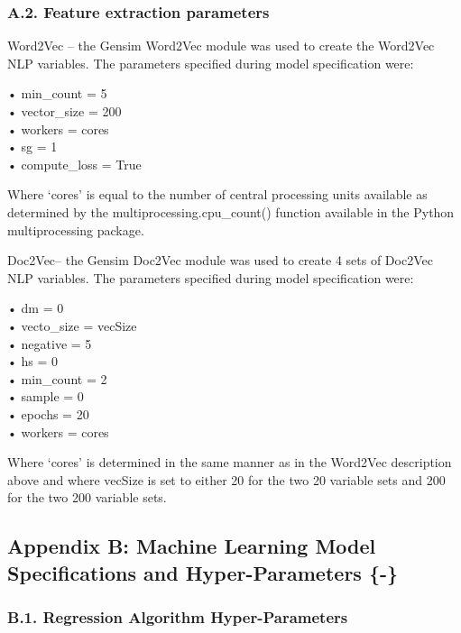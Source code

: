 \documentclass[11pt,preprint, authoryear]{elsarticle}
\numberwithin{equation}{section}
\numberwithin{figure}{section}
\numberwithin{table}{section}
\begin{document}
\hypertarget{a.2.-feature-extraction-parameters}{%
\subsubsection*{A.2. Feature extraction
parameters}\label{a.2.-feature-extraction-parameters}}

Word2Vec -- the Gensim Word2Vec module was used to create the Word2Vec
NLP variables. The parameters specified during model specification were:

• min\_count = 5\\
• vector\_size = 200\\
• workers = cores\\
• sg = 1\\
• compute\_loss = True

Where `cores' is equal to the number of central processing units
available as determined by the multiprocessing.cpu\_count() function
available in the Python multiprocessing package.

Doc2Vec-- the Gensim Doc2Vec module was used to create 4 sets of Doc2Vec
NLP variables. The parameters specified during model specification were:

• dm = 0\\
• vecto\_size = vecSize\\
• negative = 5\\
• hs = 0\\
• min\_count = 2\\
• sample = 0\\
• epochs = 20\\
• workers = cores

Where `cores' is determined in the same manner as in the Word2Vec
description above and where vecSize is set to either 20 for the two 20
variable sets and 200 for the two 200 variable sets.

\hypertarget{appendix-b-machine-learning-model-specifications-and-hyper-parameters--}{%
\subsection{\texorpdfstring{Appendix B: Machine Learning Model
Specifications and Hyper-Parameters \{-\}
\label{Appendix B}}{Appendix B: Machine Learning Model Specifications and Hyper-Parameters \{-\} }}\label{appendix-b-machine-learning-model-specifications-and-hyper-parameters--}}

\hypertarget{b.1.-regression-algorithm-hyper-parameters}{%
\subsubsection*{B.1. Regression Algorithm
Hyper-Parameters}\label{b.1.-regression-algorithm-hyper-parameters}}
\end{document}
